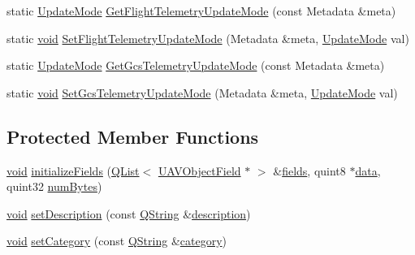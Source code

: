 \begin{DoxyCompactItemize}
\item 
static \hyperlink{group___u_a_v_objects_plugin_ga08c0580992fcd51c2b44734e2d24cac6}{Update\-Mode} \hyperlink{group___u_a_v_objects_plugin_ga6cd43aaa339c4bd8beead8988bb9f1a6}{Get\-Flight\-Telemetry\-Update\-Mode} (const Metadata \&meta)
\item 
static \hyperlink{group___u_a_v_objects_plugin_ga444cf2ff3f0ecbe028adce838d373f5c}{void} \hyperlink{group___u_a_v_objects_plugin_gaa9fa161b9a5607e4ee1086b72f1b70e5}{Set\-Flight\-Telemetry\-Update\-Mode} (Metadata \&meta, \hyperlink{group___u_a_v_objects_plugin_ga08c0580992fcd51c2b44734e2d24cac6}{Update\-Mode} val)
\item 
static \hyperlink{group___u_a_v_objects_plugin_ga08c0580992fcd51c2b44734e2d24cac6}{Update\-Mode} \hyperlink{group___u_a_v_objects_plugin_ga81651b86ef2cf0b05483152c6728b742}{Get\-Gcs\-Telemetry\-Update\-Mode} (const Metadata \&meta)
\item 
static \hyperlink{group___u_a_v_objects_plugin_ga444cf2ff3f0ecbe028adce838d373f5c}{void} \hyperlink{group___u_a_v_objects_plugin_ga8fdb0f35b52c8dea0a512fd411d2346e}{Set\-Gcs\-Telemetry\-Update\-Mode} (Metadata \&meta, \hyperlink{group___u_a_v_objects_plugin_ga08c0580992fcd51c2b44734e2d24cac6}{Update\-Mode} val)
\end{DoxyCompactItemize}
\subsection*{Protected Member Functions}
\begin{DoxyCompactItemize}
\item 
\hyperlink{group___u_a_v_objects_plugin_ga444cf2ff3f0ecbe028adce838d373f5c}{void} \hyperlink{group___u_a_v_objects_plugin_ga7aa3a71a68a9190731f720ad0eb1c772}{initialize\-Fields} (\hyperlink{class_q_list}{Q\-List}$<$ \hyperlink{class_u_a_v_object_field}{U\-A\-V\-Object\-Field} $\ast$ $>$ \&\hyperlink{group___u_a_v_objects_plugin_gaafc65699167bc5cedfd058400e484df6}{fields}, quint8 $\ast$\hyperlink{glext_8h_a8850df0785e6fbcc2351af3b686b8c7a}{data}, quint32 \hyperlink{group___u_a_v_objects_plugin_ga260cfb19e663f64d51ba1258e760a207}{num\-Bytes})
\item 
\hyperlink{group___u_a_v_objects_plugin_ga444cf2ff3f0ecbe028adce838d373f5c}{void} \hyperlink{group___u_a_v_objects_plugin_ga9310ee9c9869110219a7fcd311aaaf28}{set\-Description} (const \hyperlink{group___u_a_v_objects_plugin_gab9d252f49c333c94a72f97ce3105a32d}{Q\-String} \&\hyperlink{group___u_a_v_objects_plugin_gaeeb0e865791ad6b21d83ef571d1ce48b}{description})
\item 
\hyperlink{group___u_a_v_objects_plugin_ga444cf2ff3f0ecbe028adce838d373f5c}{void} \hyperlink{group___u_a_v_objects_plugin_gac1d47f2428a0939dbe9544b6c6add6b5}{set\-Category} (const \hyperlink{group___u_a_v_objects_plugin_gab9d252f49c333c94a72f97ce3105a32d}{Q\-String} \&\hyperlink{group___u_a_v_objects_plugin_gae96da3f59e51fb5c3ca43056bda4a63e}{category})
\end{DoxyCompactItemize}
